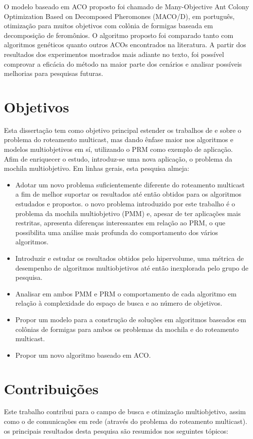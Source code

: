 O modelo baseado em ACO proposto foi chamado de Many-Objective Ant Colony Optimization Based on Decomposed Pheromones (MACO/D), em português, otimização para muitos objetivos com colônia de formigas baseada em decomposição de feromônios. O algoritmo proposto foi comparado tanto com algoritmos genéticos quanto outros ACOs encontrados na literatura. A partir dos resultados dos experimentos mostrados mais adiante no texto, foi possível comprovar a eficácia do método na maior parte dos cenários e analisar possíveis melhorias para pesquisas futuras.

\section{Objetivos}
Esta dissertação tem como objetivo principal estender os trabalhos de \cite{Lafeta2016} e \cite{Bueno2010} sobre o problema do roteamento multicast, mas dando ênfase maior nos algoritmos e modelos multiobjetivos em sí, utilizando o PRM como exemplo de aplicação. Afim de enriquecer o estudo, introduz-se uma nova aplicação, o problema da mochila multiobjetivo. Em linhas gerais, esta pesquisa almeja:
 
\begin{itemize}  
	\item Adotar um novo problema suficientemente diferente do roteamento multicast a fim de melhor suportar os resultados até então obtidos para os algoritmos estudados e propostos. o novo problema introduzido por este trabalho é o problema da mochila multiobjetivo (PMM) e, apesar de ter aplicações mais restritas, apresenta diferenças interessantes em relação ao PRM, o que possibilita uma análise mais profunda do comportamento dos vários algoritmos.
	\item Introduzir e estudar os resultados obtidos pelo hipervolume, uma métrica de desempenho de algoritmos multiobjetivos até então inexplorada pelo grupo de pesquisa.
	\item Analisar em ambos PMM e PRM o comportamento de cada algoritmo em relação à complexidade do espaço de busca e ao número de objetivos.
	\item Propor um modelo para a construção de soluções em algoritmos baseados em colônias de formigas para ambos os problemas da mochila e do roteamento multicast.
	\item Propor um novo algoritmo baseado em ACO.
\end{itemize}


\section{Contribuições}
Este trabalho contribui para o campo de busca e otimização multiobjetivo, assim como o de comunicações em rede (através do problema do roteamento multicast). os principais resultados desta pesquisa são resumidos nos seguintes tópicos:

